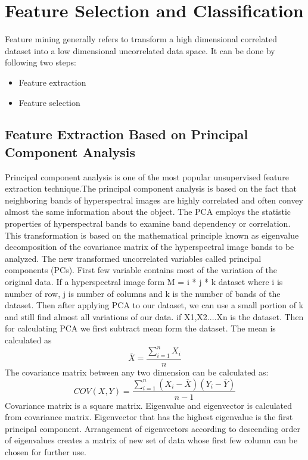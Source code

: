 \documentclass[document.tex]{subfiles}
\begin{document}
\chapter{Feature Selection and Classification}
\noindent Feature mining generally refers to transform a high dimensional correlated dataset into a low dimensional uncorrelated data space. It can be done by following two steps:
\begin{itemize}
	\item Feature extraction
	\item Feature selection
\end{itemize}

\section{Feature Extraction Based on Principal Component Analysis}
\noindent Principal component analysis is one of the most popular unsupervised feature extraction technique.The principal component analysis is based on the fact that neighboring bands of hyperspectral images are highly correlated and often convey almost the same information about the object. The PCA employs the statistic properties of
hyperspectral bands to examine band dependency or correlation. This transformation
is based on the mathematical principle known as eigenvalue decomposition of the
covariance matrix of the hyperspectral image bands to be analyzed. The new transformed uncorrelated variables called principal components (PCs). First few variable contains most of the variation of the original data. If a hyperspectral image form M = i * j * k dataset where i is number of row, j is number of columns and k is the number of bands of the dataset. Then after applying PCA to our dataset, we can use a small portion of k and still find almost all variations of our data. if X1,X2....Xn is the dataset. Then for calculating PCA we first subtract mean form the dataset. The mean is calculated as
\begin{equation}
\overline{X} = \dfrac{\sum_{i=1}^{n} X_i}{n}
\label{eq:Mean}
\end{equation}
The covariance matrix between any two dimension can be calculated as:
\begin{equation}
COV(X,Y) = \dfrac{\sum_{i=1}^{n}(X_i - \overline{X})(Y_i - \overline{Y})}{n-1}
\end{equation}
Covariance matrix is a square matrix. Eigenvalue and eigenvector is calculated from covariance matrix. Eigenvector that has the highest eigenvalue is the first principal component. Arrangement of eigenvectors according to descending order of eigenvalues creates a matrix of new set of data whose first few column can be chosen for further use. 
\end{document}
